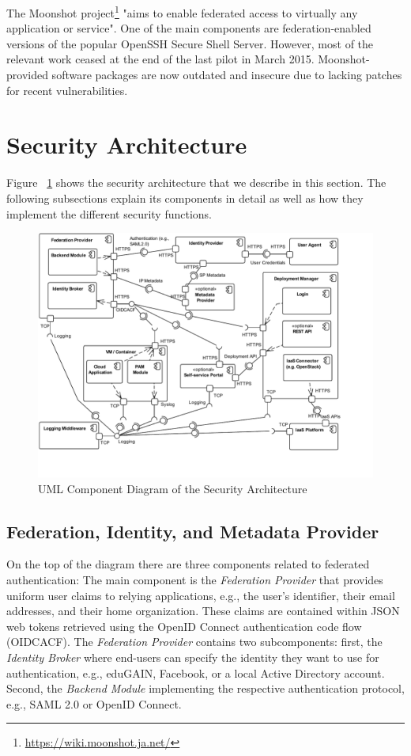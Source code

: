 \documentclass{llncs}
\begin{document}
The Moonshot project\footnote{\url{https://wiki.moonshot.ja.net/}} "aims to enable federated access to virtually any application or service". One of the main components are federation-enabled versions of the popular OpenSSH Secure Shell Server. However, most of the relevant work ceased at the end of the last pilot in March 2015. Moonshot-provided software packages are now outdated and insecure due to lacking patches for recent vulnerabilities.

\section{Security Architecture} \label{sec:architecture}
Figure ~\ref{fig:architecture} shows the security architecture that we describe in this section. The following subsections explain its components in detail as well as how they implement the different security functions.

\begin{figure}
	\vspace*{-0.5cm}
	\centering
	\includegraphics[width=\columnwidth, clip=true, trim=0cm 1.4cm 1.8cm 0cm]{uml_components.pdf}
	\caption{UML Component Diagram of the Security Architecture}
	\label{fig:architecture}
\end{figure}



\subsection{Federation, Identity, and Metadata Provider}

On the top of the diagram there are three components related to federated authentication: The main component is the \textit{Federation Provider} that provides uniform user claims to relying applications, e.g., the user's identifier, their email addresses, and their home organization. These claims are contained within JSON web tokens retrieved using the OpenID Connect authentication code flow (OIDCACF). The \textit{Federation Provider} contains two subcomponents: first, the \textit{Identity Broker} where end-users can specify the identity they want to use for authentication, e.g., eduGAIN, Facebook, or a local Active Directory account. Second, the \textit{Backend Module} implementing the respective authentication protocol, e.g., SAML 2.0 or OpenID Connect.
\end{document}
